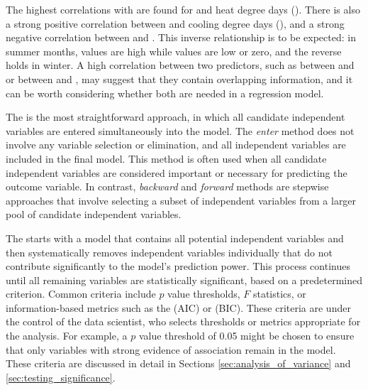 The highest correlations with  are found for  and heat degree days (). 
There is also a strong positive correlation between  and cooling degree days (), and a strong negative correlation between  and . 
This inverse relationship is to be expected: in summer months,  values are high while  values are low or zero, and the reverse holds in winter. 
A high correlation between two predictors, such as between  and  or between  and , may suggest that they contain overlapping information, and it can be worth considering whether both are needed in a regression model.

\bigskip
The  is the most straightforward approach, in which all candidate independent variables are entered simultaneously into the model. The \emph{enter} method does not involve any variable selection or elimination, and all independent variables are included in the final model. This method is often used when all candidate independent variables are considered important or necessary for predicting the outcome variable. In contrast, \emph{backward} and \emph{forward} methods are stepwise approaches that involve selecting a subset of independent variables from a larger pool of candidate independent variables.

The  starts with a model that contains all potential independent variables and then systematically removes independent variables individually that do not contribute significantly to the model's prediction power. This process continues until all remaining variables are statistically significant, based on a predetermined criterion. Common criteria include $p$ value thresholds, $F$ statistics, or information-based metrics such as the  (AIC) or  (BIC). These criteria are under the control of the data scientist, who selects thresholds or metrics appropriate for the analysis. For example, a $p$ value threshold of 0.05 might be chosen to ensure that only variables with strong evidence of association remain in the model. These criteria are discussed in detail in Sections \ref{sec:analysis_of_variance} and \ref{sec:testing_significance}.

